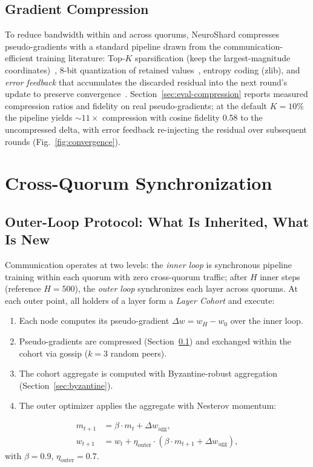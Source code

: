 \documentclass[conference]{IEEEtran}
\begin{document}
\subsection{Gradient Compression}
\label{sec:compression}

To reduce bandwidth within and across quorums, NeuroShard compresses pseudo-gradients with a standard pipeline drawn from the communication-efficient training literature: Top-$K$ sparsification (keep the largest-magnitude coordinates)~\cite{lin2018deep}, 8-bit quantization of retained values~\cite{alistarh2017qsgd}, entropy coding (zlib), and \emph{error feedback} that accumulates the discarded residual into the next round's update to preserve convergence~\cite{karimireddy2019error}. Section~\ref{sec:eval-compression} reports measured compression ratios and fidelity on real pseudo-gradients; at the default $K{=}10\%$ the pipeline yields ${\sim}11\times$ compression with cosine fidelity 0.58 to the uncompressed delta, with error feedback re-injecting the residual over subsequent rounds (Fig.~\ref{fig:convergence}).

\section{Cross-Quorum Synchronization}
\label{sec:diloco}

\subsection{Outer-Loop Protocol: What Is Inherited, What Is New}
\label{sec:outer}

Communication operates at two levels: the \emph{inner loop} is synchronous pipeline training within each quorum with zero cross-quorum traffic; after $H$ inner steps (reference $H{=}500$), the \emph{outer loop} synchronizes each layer across quorums. At each outer point, all holders of a layer form a \emph{Layer Cohort} and execute:
\begin{enumerate}
    \item Each node computes its pseudo-gradient $\Delta w = w_H - w_0$ over the inner loop.
    \item Pseudo-gradients are compressed (Section~\ref{sec:compression}) and exchanged within the cohort via gossip ($k{=}3$ random peers).
    \item The cohort aggregate is computed with Byzantine-robust aggregation (Section~\ref{sec:byzantine}).
    \item The outer optimizer applies the aggregate with Nesterov momentum:
\end{enumerate}
\begin{align}
m_{t+1} &= \beta \cdot m_t + \Delta w_{\text{agg}}, \label{eq:momentum} \\
w_{t+1} &= w_t + \eta_{\text{outer}} \cdot (\beta \cdot m_{t+1} + \Delta w_{\text{agg}}), \label{eq:nesterov}
\end{align}
with $\beta = 0.9$, $\eta_{\text{outer}} = 0.7$.
\end{document}
